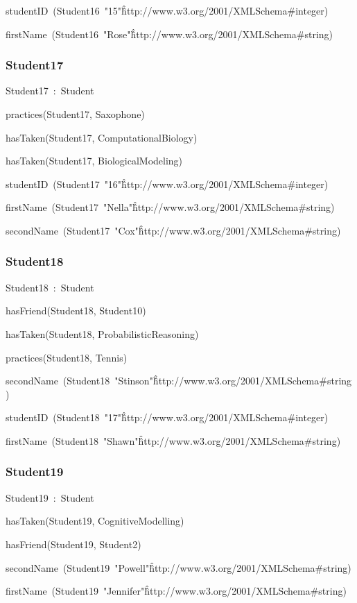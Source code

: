 \documentclass{article}
\begin{document}
studentID~(Student16~"15"\^\^http://www.w3.org/2001/XMLSchema#integer)

firstName~(Student16~"Rose"\^\^http://www.w3.org/2001/XMLSchema#string)

\subsubsection*{Student17}

Student17~:~Student

practices(Student17, Saxophone)

hasTaken(Student17, ComputationalBiology)

hasTaken(Student17, BiologicalModeling)

studentID~(Student17~"16"\^\^http://www.w3.org/2001/XMLSchema#integer)

firstName~(Student17~"Nella"\^\^http://www.w3.org/2001/XMLSchema#string)

secondName~(Student17~"Cox"\^\^http://www.w3.org/2001/XMLSchema#string)

\subsubsection*{Student18}

Student18~:~Student

hasFriend(Student18, Student10)

hasTaken(Student18, ProbabilisticReasoning)

practices(Student18, Tennis)

secondName~(Student18~"Stinson"\^\^http://www.w3.org/2001/XMLSchema#string)

studentID~(Student18~"17"\^\^http://www.w3.org/2001/XMLSchema#integer)

firstName~(Student18~"Shawn"\^\^http://www.w3.org/2001/XMLSchema#string)

\subsubsection*{Student19}

Student19~:~Student

hasTaken(Student19, CognitiveModelling)

hasFriend(Student19, Student2)

secondName~(Student19~"Powell"\^\^http://www.w3.org/2001/XMLSchema#string)

firstName~(Student19~"Jennifer"\^\^http://www.w3.org/2001/XMLSchema#string)
\end{document}
